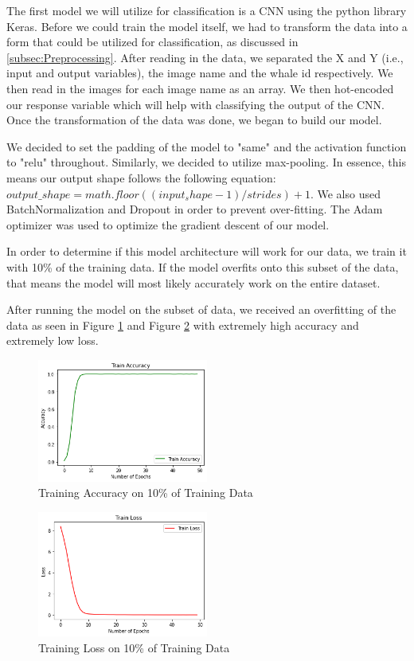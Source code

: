 \documentclass[paper=a4, fontsize=11pt]{scrartcl}
\numberwithin{equation}{section}		%
\numberwithin{table}{section}				%
\begin{document}
The first model we will utilize for classification is a CNN using the python library Keras. Before we could train the model itself, we had to transform the data into a form that could be utilized for classification, as discussed in  \autoref{subsec:Preprocessing}. After reading in the data, we separated the X and Y (i.e., input and output variables), the image name and the whale id respectively. We then read in the images for each image name as an array. We then hot-encoded our response variable which will help with classifying the output of the CNN. Once the transformation of the data was done, we began to build our model.

We decided to set the padding of the model to "same" and the activation function to "relu" throughout. Similarly, we decided to utilize max-pooling. In essence, this means our output shape follows the following equation: $output\_shape = math.floor((input_shape - 1) / strides) + 1$. We also used BatchNormalization and Dropout in order to prevent over-fitting. The Adam optimizer was used to optimize the gradient descent of our model.

In order to determine if this model architecture will work for our data, we train it with 10\% of the training data. If the model overfits onto this subset of the data, that means the model will most likely accurately work on the entire dataset.

After running the model on the subset of data, we received an overfitting of the data as seen in Figure \ref{fig:cnn_acc_10p} and Figure \ref{fig:cnn_loss_10p} with extremely high accuracy and extremely low loss.

\begin{figure}[h]
    \centering
    \includegraphics[width=0.5\textwidth]{training_cnn_acc_10p.png}
    \caption{Training Accuracy on 10\% of Training Data}
    \label{fig:cnn_acc_10p}
\end{figure}

\begin{figure}[h]
    \centering
    \includegraphics[width=0.5\textwidth]{training_10p_loss.png}
    \caption{Training Loss on 10\% of Training Data}
    \label{fig:cnn_loss_10p}
\end{figure}
\end{document}
